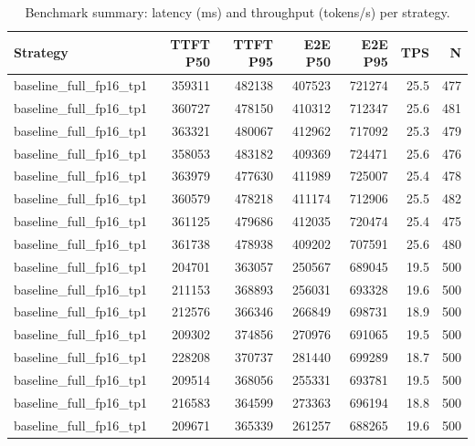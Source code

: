 \begin{table}
\caption{Benchmark summary: latency (ms) and throughput (tokens/s) per strategy.}
\label{tab:summary}
\begin{tabular}{lrrrrrr}
\toprule
Strategy & TTFT P50 & TTFT P95 & E2E P50 & E2E P95 & TPS & N \\
\midrule
baseline_full_fp16_tp1 & 359311 & 482138 & 407523 & 721274 & 25.5 & 477 \\
baseline_full_fp16_tp1 & 360727 & 478150 & 410312 & 712347 & 25.6 & 481 \\
baseline_full_fp16_tp1 & 363321 & 480067 & 412962 & 717092 & 25.3 & 479 \\
baseline_full_fp16_tp1 & 358053 & 483182 & 409369 & 724471 & 25.6 & 476 \\
baseline_full_fp16_tp1 & 363979 & 477630 & 411989 & 725007 & 25.4 & 478 \\
baseline_full_fp16_tp1 & 360579 & 478218 & 411174 & 712906 & 25.5 & 482 \\
baseline_full_fp16_tp1 & 361125 & 479686 & 412035 & 720474 & 25.4 & 475 \\
baseline_full_fp16_tp1 & 361738 & 478938 & 409202 & 707591 & 25.6 & 480 \\
baseline_full_fp16_tp1 & 204701 & 363057 & 250567 & 689045 & 19.5 & 500 \\
baseline_full_fp16_tp1 & 211153 & 368893 & 256031 & 693328 & 19.6 & 500 \\
baseline_full_fp16_tp1 & 212576 & 366346 & 266849 & 698731 & 18.9 & 500 \\
baseline_full_fp16_tp1 & 209302 & 374856 & 270976 & 691065 & 19.5 & 500 \\
baseline_full_fp16_tp1 & 228208 & 370737 & 281440 & 699289 & 18.7 & 500 \\
baseline_full_fp16_tp1 & 209514 & 368056 & 255331 & 693781 & 19.5 & 500 \\
baseline_full_fp16_tp1 & 216583 & 364599 & 273363 & 696194 & 18.8 & 500 \\
baseline_full_fp16_tp1 & 209671 & 365339 & 261257 & 688265 & 19.6 & 500 \\
\bottomrule
\end{tabular}
\end{table}

